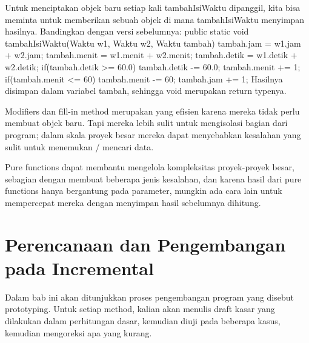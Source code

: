Untuk menciptakan objek baru setiap kali tambahIsiWaktu dipanggil, kita bisa meminta untuk memberikan sebuah objek di mana tambahIsiWaktu menyimpan hasilnya. Bandingkan dengan versi sebelumnya:
\newline
public static void tambahIsiWaktu(Waktu w1, Waktu w2, Waktu tambah)\textbraceleft \newline
	tambah.jam = w1.jam + w2.jam; \newline
	tambah.menit = w1.menit + w2.menit; \newline
	tambah.detik = w1.detik + w2.detik; \newline
\newline
	if(tambah.detik \textgreater = 60.0)\textbraceleft \newline
		tambah.detik -= 60.0; \newline
		tambah.menit += 1; \newline
	\textbraceright \newline
\newline
	if(tambah.menit \textless = 60)\textbraceleft \newline
		tambah.menit -= 60; \newline
		tambah.jam += 1; \newline
	\textbraceright \newline
\textbraceright \newline
Hasilnya disimpan dalam variabel tambah, sehingga void merupakan return typenya.

Modifiers dan fill-in method merupakan yang efisien karena mereka tidak perlu membuat objek baru. Tapi mereka lebih sulit untuk mengisolasi bagian dari program; dalam skala proyek besar mereka dapat menyebabkan kesalahan yang sulit untuk menemukan / mencari data.

Pure functions dapat membantu mengelola kompleksitas proyek-proyek besar, sebagian dengan membuat beberapa jenis kesalahan, dan karena hasil dari pure functions hanya bergantung pada parameter, mungkin ada cara lain untuk mempercepat mereka dengan menyimpan hasil sebelumnya dihitung.
\newline
\section{Perencanaan dan Pengembangan pada Incremental}

Dalam bab ini akan ditunjukkan proses pengembangan program yang disebut prototyping. Untuk setiap method, kalian akan menulis draft kasar yang dilakukan dalam perhitungan dasar, kemudian diuji pada beberapa kasus, kemudian mengoreksi apa yang kurang.

